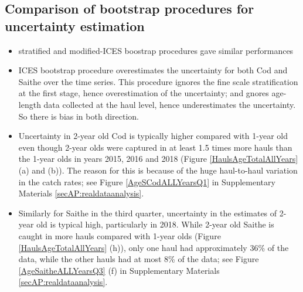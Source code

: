 \documentclass[a4paper 12pt]{article}
\numberwithin{equation}{section}
\begin{document}
\begin{figure}[h!]
\begin{tabular}{@{}ccc@{}}
\end{tabular}
\end{figure} 


\subsection{Comparison of bootstrap procedures for uncertainty estimation}
\begin{itemize}
\item stratified and modified-ICES boostrap procedures gave similar performances
\item ICES bootstrap procedure overestimates the uncertainty for both Cod and Saithe over the time series. This procedure ignores the fine scale stratification at the first stage, hence overestimation of the uncertainty; and gnores age-length data collected at the haul level, hence underestimates the uncertainty. So there is bias in both direction. 
\item Uncertainty in 2-year old Cod is typically higher compared with 1-year old even though 2-year olds were captured in at least 1.5 times more hauls than the 1-year olds in years 2015, 2016 and 2018 (Figure \ref{HaulsAgeTotalAllYears} (a) and (b)). The reason for this is because of the huge haul-to-haul variation in the catch rates;  see Figure \ref{AgeSCodALLYearsQ1} in Supplementary Materials \ref{secAP:realdataanalysis}.
\item Similarly for Saithe in the third quarter, uncertainty in the estimates of 2-year old is typical high, particularly in 2018. While 2-year old Saithe is caught in more hauls compared with 1-year olds (Figure \ref{HaulsAgeTotalAllYears} (h)), only one haul had approximately 36\% of the data, while the other hauls had at most 8\% of the data; see Figure \ref{AgeSaitheALLYearsQ3} (f) in Supplementary Materials \ref{secAP:realdataanalysis}.
\end{itemize}
\end{document}
